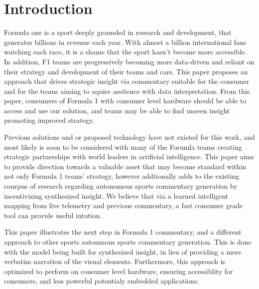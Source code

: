 \section{Introduction}
 
Formula one is a sport deeply grounded in research and development, that generates billions in revenue each year. With almost a billion international fans watching each race, it is a shame that the sport hasn't become more accessible. In addition, F1 teams are progressively becoming more data-driven and reliant on their strategy and development of their teams and cars. This paper proposes an approach that drives strategic insight via commentary suitable for the consumer and for the teams aiming to aquire assitence with data interpretation. From this paper, consumers of Formula 1 with consumer level hardware should be able to access and use our solution, and teams may be able to find unseen insight promoting improved strategy.

Previous solutions and or proposed technology have not existed for this work, and most likely is soon to be considered with many of the Forumla teams creating strategic partnerships with world leaders in artificial intelligence. This paper aims to provide direction towards a valuable asset that may become standard within not only Formula 1 teams' strategy, however addtionally adds to the existing courpus of research regarding autonomous sports commentary generation by incentivizing synthesized insight. We believe that via a learned intelligent mapping from live telemetry and previous commentary, a fast consumer grade tool can provide useful intution.  

This paper illustrates the next step in Formula 1 commentary, and a different approach to other sports autonmous sports commentary generation. This is done with the model being built for synthesized insight, in lieu of providing a mere verbatim narration of the visual elements. Furthermore, this approach is optimized to perform on consumer level hardware, ensuring accessiblity for consumers, and less powerful potentialy embedded applications. 